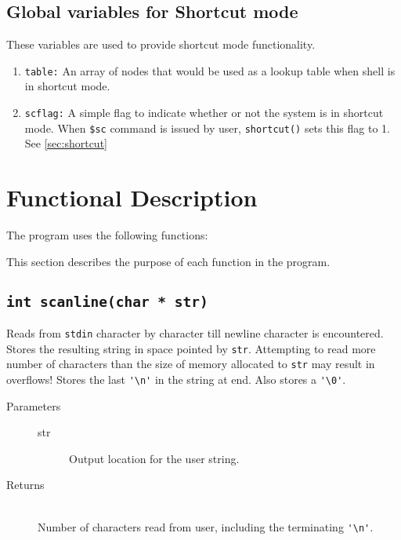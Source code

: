 \documentclass{article}
\begin{document}
\subsection{Global variables for Shortcut mode} \label{sec:shortcutgvs}

These variables are used to provide shortcut mode functionality.
\begin{enumerate}
	\item \lstinline{table:} An array of nodes that would be used as a lookup table when shell is in shortcut mode.
	\item \lstinline{scflag:} A simple flag to indicate whether or not the system is in shortcut mode. When \lstinline{$sc} command is issued by user, \lstinline{shortcut()} sets this flag to 1. See \ref{sec:shortcut}
\end{enumerate} 




\section{Functional Description}
The program uses the following functions:


This section describes the purpose of each function in the program.

\subsection{\lstinline{int scanline(char * str)}}
Reads from \lstinline{stdin} character by character till newline character is encountered. Stores the resulting string in space pointed by \lstinline{str}. Attempting to read more number of characters than the size of memory allocated to \lstinline{str} may result in overflows! Stores the last \lstinline{'\n'} in the string at end. Also stores a \lstinline{'\0'}.
\begin{description}
	\item[Parameters]\hfill
	\begin{description}
		\item[str] Output location for the user string.
	\end{description}
	\item[Returns]\hfill\\
		Number of characters read from user, including the terminating \lstinline{'\n'}. 
\end{description}
\end{document}
